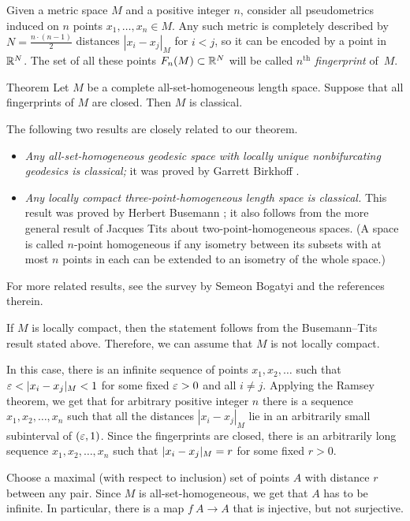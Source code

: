 \documentclass[a4paper,10pt]{article}
\begin{document}
Given a metric space $M$ and a positive integer $n$, consider all pseudometrics induced on $n$ points $x_1,\dots, x_n\in M$.
Any such metric is completely described by $N=\tfrac{n\cdot (n-1)}2$ distances $|x_i-x_j|_M$ for $i<j$, so it can be encoded by a point in $\mathbb{R}^N$.
The set of all these points $F_n(M)\subset \mathbb{R}^N$ will be called \emph{$n^\text{th}$ fingerprint} of~$M$.

\begin{thm}{Theorem}\label{all-sets}
Let $M$ be a complete all-set-homogeneous length space.
Suppose that all fingerprints of $M$ are closed.
Then $M$ is classical.
\end{thm}

The following two results are closely related to our theorem.
\begin{itemize}
\item \emph{Any all-set-homogeneous geodesic space with locally unique nonbifurcating geodesics is classical;} it was proved by Garrett Birkhoff \cite{birkhoff}.
\item \emph{Any locally compact three-point-homogeneous length space is classical.}
 This result was proved by Herbert Busemann \cite{busemann}; it also follows from the more general result of Jacques Tits \cite{tits} about two-point-homogeneous spaces.
 (A space is called $n$-point homogeneous if any isometry between its subsets with at most $n$ points in each can be extended to an isometry of the whole space.)
\end{itemize}
For more related results, see the survey by Semeon Bogatyi \cite{bogaty} and the references therein.

If $M$ is locally compact, then the statement follows from the Busemann--Tits result stated above.
Therefore, we can assume that $M$ is not locally compact.

In this case, there is an infinite sequence of points $x_1,x_2,\dots$ such that 
$\eps\z<|x_i-x_j|_M<1$ for some fixed $\varepsilon>0$ and all $i\ne j$.
Applying the Ramsey theorem, we get that for arbitrary positive integer $n$ there is a sequence $x_1,x_2,\dots,x_n$ such that all the distances
$|x_i-x_j|_M$ lie in an arbitrarily small subinterval of $(\varepsilon,1)$.
Since the fingerprints are closed, there is an arbitrarily long sequence 
$x_1,x_2,\dots,x_n$ such that 
$|x_i\z-x_j|_M= r$ for some fixed $r>0$.

Choose a maximal (with respect to inclusion) set of points $A$ with distance $r$ between any pair.
Since $M$ is all-set-homogeneous, we get that $A$ has to be infinite.
In particular, there is a map $f\:A\to A$ that is injective, but not surjective.
\end{document}
